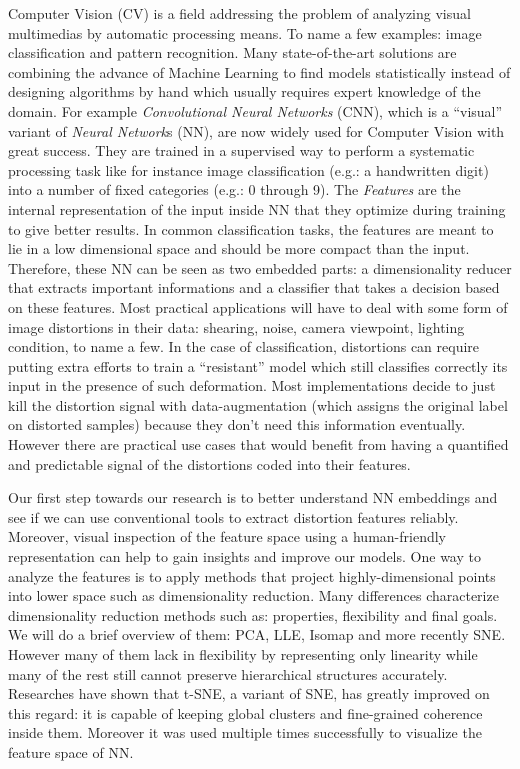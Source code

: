 \documentclass[a4paper,12pt]{report}
\newcommand{\eg}{e.g.}
\begin{document}
Computer Vision (CV) is a field addressing the problem of analyzing visual multimedias by automatic processing means.
To name a few examples: image classification and pattern recognition.
Many state-of-the-art solutions are combining the advance of Machine Learning to find models statistically instead of designing algorithms by hand which usually requires expert knowledge of the domain.
For example {\em Convolutional Neural Networks} (CNN), which is a ``visual'' variant of {\em Neural Network}s (NN), are now widely used for Computer Vision with great success\cite{krizhevsky2012imagenet}\cite{rowley1998neural}\cite{prechelt1994proben1}.
They are trained in a supervised way to perform a systematic processing task like for instance image classification (\eg: a handwritten digit) into a number of fixed categories (\eg: 0 through 9).
The {\em Features} are the internal representation of the input inside NN that they optimize during training to give better results.
In common classification tasks, the features are meant to lie in a low dimensional space and should be more compact than the input.
Therefore, these NN can be seen as two embedded parts: a dimensionality reducer that extracts important informations and a classifier that takes a decision based on these features.
Most practical applications will have to deal with some form of image distortions in their data: shearing, noise, camera viewpoint, lighting condition, to name a few.
In the case of classification, distortions can require putting extra efforts to train a ``resistant'' model which still classifies correctly its input in the presence of such deformation.
Most implementations decide to just kill the distortion signal with data-augmentation (which assigns the original label on distorted samples) because they don't need this information eventually.
However there are practical use cases that would benefit from having a quantified and predictable signal of the distortions coded into their features.

Our first step towards our research is to better understand NN embeddings and see if we can use conventional tools to extract distortion features reliably.
Moreover, visual inspection of the feature space using a human-friendly representation can help to gain insights and improve our models.
One way to analyze the features is to apply methods that project highly-dimensional points into lower space such as dimensionality reduction.
Many differences characterize dimensionality reduction methods such as: properties, flexibility and final goals.
We will do a brief overview of them: PCA, LLE, Isomap and more recently SNE.
However many of them lack in flexibility by representing only linearity while many of the rest still cannot preserve hierarchical structures accurately\cite{t-SNE}.
Researches have shown that t-SNE, a variant of SNE, has greatly improved on this regard: it is capable of keeping global clusters and fine-grained coherence inside them.
Moreover it was used multiple times successfully to visualize the feature space of NN\cite{donahue2013decaf}\cite{yu2014visualizing}.
\end{document}
